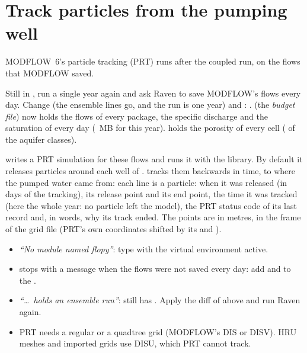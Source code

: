 \section{Track particles from the pumping well}
MODFLOW~6's particle tracking (PRT) runs after the coupled run, on the flows that MODFLOW saved.

Still in , run a single year again and ask Raven to save MODFLOW's flows every day. Change
 (the ensemble lines go, and the run is one year) and :
\see {}.
\why {} (the \emph{budget file}) now holds the flows of every package, the specific discharge and
the saturation of every day (~MB for this year).  holds the porosity of every cell
( of the aquifer classes).

 writes a PRT simulation for these flows and runs it with the library. By default it releases
 particles around each well of .  tracks them backwards in time, to where the
pumped water came from:
\why each line is a particle: when it was released (in days of the tracking), its release point and its end point, the
time it was tracked (here the whole year: no particle left the model), the PRT status code of its last record and, in
words, why its track ended. The points are in metres, in the frame of the grid file  (PRT's own
coordinates shifted by its  and ).
\begin{trouble}
\begin{itemize}
\item \emph{``No module named flopy''}: type  with the virtual environment active.
\item {} stops with a message when the flows were not saved every day: add  and
   to the .
\item \emph{``\dots\ holds an ensemble run''}:  still has . Apply the diff of
   above and run Raven again.
\item PRT needs a regular or a quadtree grid (MODFLOW's DIS or DISV). HRU meshes and imported grids use DISU, which PRT
  cannot track.
\end{itemize}
\end{trouble}

